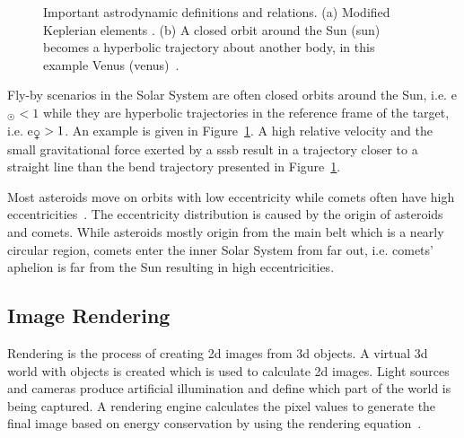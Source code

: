 \begin{figure}[htb]
\begin{subfigure}[b]{0.47\textwidth}
        \caption{}
        \label{fig:hyperbolic_orbit}
    \end{subfigure}
    \label{fig:astrodynamics}
    \caption{Important astrodynamic definitions and relations. (a) Modified Keplerian elements \cite{Commons2019Orbit}. (b) A closed orbit around the Sun (\gls{sun}) becomes a hyperbolic trajectory about another body, in this example Venus (\gls{venus})~\cite{Hintz2015FundamentalsAstrodynamics}.}
\end{figure}

Fly-by scenarios in the Solar System are often closed orbits around the Sun, i.e. \gls{e}$_{\astrosun} < 1$ while they are hyperbolic trajectories in the reference frame of the target, i.e. \gls{e}$_{\venus} > 1$. An example is given in Figure~\ref{fig:hyperbolic_orbit}. A high relative velocity and the small gravitational force exerted by a \gls{sssb} result in a trajectory closer to a straight line than the bend trajectory presented in Figure~\ref{fig:hyperbolic_orbit}. 

Most asteroids move on orbits with low eccentricity while comets often have high eccentricities~\cite{ChamberlinCometDistribution}. The eccentricity distribution is caused by the origin of asteroids and comets. While asteroids mostly origin from the main belt which is a nearly circular region, comets enter the inner Solar System from far out, i.e. comets' aphelion is far from the Sun resulting in high eccentricities.

\subsection{Image Rendering}
Rendering is the process of creating \gls{2d} images from \gls{3d} objects. A virtual \gls{3d} world with objects is created which is used to calculate \gls{2d} images. Light sources and cameras produce artificial illumination and define which part of the world is being captured. A rendering engine calculates the pixel values to generate the final image based on energy conservation by using the rendering equation~\cite{Kajiya1986TheEquation}.

